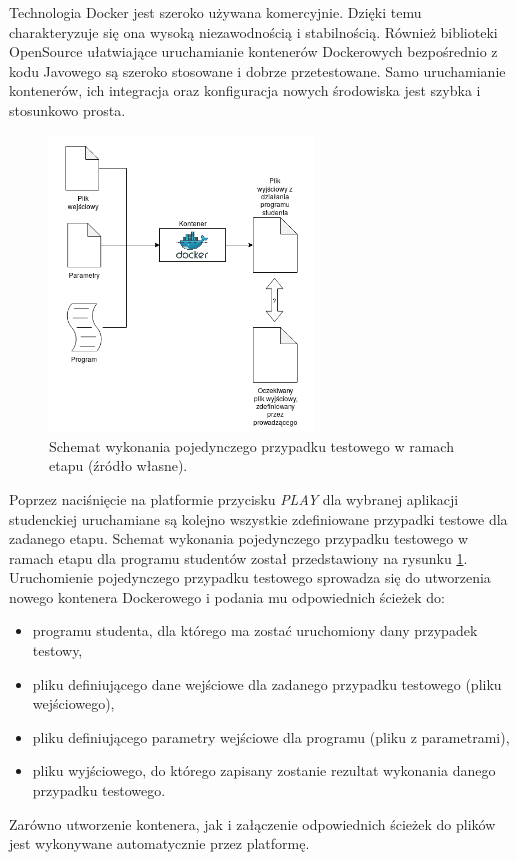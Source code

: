 Technologia Docker jest szeroko używana komercyjnie.
Dzięki temu charakteryzuje się ona wysoką niezawodnością i stabilnością.
Również biblioteki OpenSource ułatwiające uruchamianie kontenerów Dockerowych bezpośrednio z kodu Javowego są szeroko stosowane i dobrze przetestowane.
Samo uruchamianie kontenerów, ich integracja oraz konfiguracja nowych środowiska jest szybka i stosunkowo prosta.

\begin{figure}[h]
    \centering
    \includegraphics[width = 7cm]{chapter05/single_test_case.png}
    \caption{Schemat wykonania pojedynczego przypadku testowego w ramach etapu (źródło własne).}
    \label{fig:single-test-case}
\end{figure}

Poprzez naciśnięcie na platformie przycisku \textit{PLAY} dla wybranej aplikacji studenckiej uruchamiane są kolejno wszystkie zdefiniowane przypadki testowe dla zadanego etapu.
Schemat wykonania pojedynczego przypadku testowego w ramach etapu dla programu studentów został przedstawiony na rysunku \ref{fig:single-test-case}.
Uruchomienie pojedynczego przypadku testowego sprowadza się do utworzenia nowego kontenera Dockerowego i podania mu odpowiednich ścieżek do:
\begin{itemize}
    \item programu studenta, dla którego ma zostać uruchomiony dany przypadek testowy,
    \item pliku definiującego dane wejściowe dla zadanego przypadku testowego (pliku wejściowego),
    \item pliku definiującego parametry wejściowe dla programu (pliku z parametrami),
    \item pliku wyjściowego, do którego zapisany zostanie rezultat wykonania danego przypadku testowego.
\end{itemize}
Zarówno utworzenie kontenera, jak i załączenie odpowiednich ścieżek do plików jest wykonywane automatycznie przez platformę.

